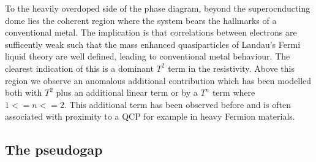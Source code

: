 To the heavily overdoped side of the phase diagram, beyond the superocnducting dome lies the coherent region where the system bears the hallmarks of a conventional metal. The implication is that correlations between electrons are sufficently weak such that the mass enhanced quasiparticles of Landau's Fermi liquid theory are well defined, leading to conventional metal behaviour. The clearest indication of this is a dominant $T^2$ term in the resistivity. Above this region we observe an anomalous additional contribution which has been modelled both with $T^2$ plus an additional linear term or by a $T^n$ term where $1 <= n <= 2$. This additional term has been observed before and is often associated with proximity to a \ac{QCP} for example in heavy Fermion materials.

\subsection{The pseudogap}

